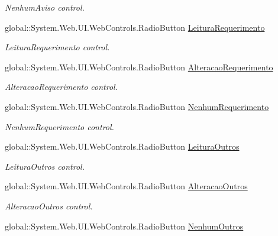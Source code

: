 \begin{DoxyCompactItemize}
\begin{DoxyCompactList}\small\item\em NenhumAviso control. \item\end{DoxyCompactList}\item 
global::System.Web.UI.WebControls.RadioButton \hyperlink{class_sistema_r_h_1_1_cadastro_user_a7e33448bca7dd95cae0bef4afd3f0d27}{LeituraRequerimento}
\begin{DoxyCompactList}\small\item\em LeituraRequerimento control. \item\end{DoxyCompactList}\item 
global::System.Web.UI.WebControls.RadioButton \hyperlink{class_sistema_r_h_1_1_cadastro_user_a9ede310987a21320038bf58b3938345e}{AlteracaoRequerimento}
\begin{DoxyCompactList}\small\item\em AlteracaoRequerimento control. \item\end{DoxyCompactList}\item 
global::System.Web.UI.WebControls.RadioButton \hyperlink{class_sistema_r_h_1_1_cadastro_user_a0b816cc331505340b5471c43a6056ae6}{NenhumRequerimento}
\begin{DoxyCompactList}\small\item\em NenhumRequerimento control. \item\end{DoxyCompactList}\item 
global::System.Web.UI.WebControls.RadioButton \hyperlink{class_sistema_r_h_1_1_cadastro_user_a222688f378ab406208912699aee5b624}{LeituraOutros}
\begin{DoxyCompactList}\small\item\em LeituraOutros control. \item\end{DoxyCompactList}\item 
global::System.Web.UI.WebControls.RadioButton \hyperlink{class_sistema_r_h_1_1_cadastro_user_aff33b5e443d82ec7ae5cb1ad0e80ca00}{AlteracaoOutros}
\begin{DoxyCompactList}\small\item\em AlteracaoOutros control. \item\end{DoxyCompactList}\item 
global::System.Web.UI.WebControls.RadioButton \hyperlink{class_sistema_r_h_1_1_cadastro_user_a0071562337337028175da44e079fef63}{NenhumOutros}

\end{DoxyCompactItemize}
